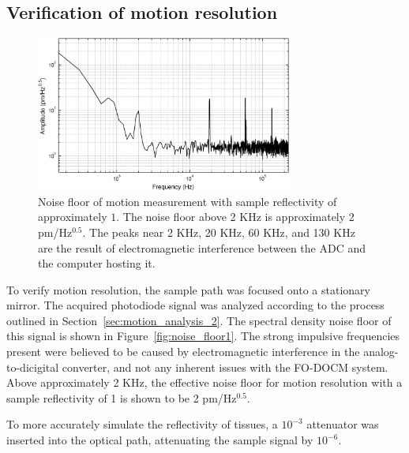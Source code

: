 \subsection{Verification of motion resolution}

\begin{figure}[h!]
\centering
\includegraphics[width=0.75\textwidth]{Images/Results/noise_floor_r1_sm.png}
\caption[Noise floor of motion measurement with sample reflectivity of approximately $1$.]{Noise floor of motion measurement with sample reflectivity of approximately $1$. The noise floor above 2 KHz is approximately 2 pm/Hz$^{0.5}$. The peaks near 2 KHz, 20 KHz, 60 KHz, and 130 KHz are the result of electromagnetic interference between the ADC and the computer hosting it. \label{ref:noise_floor1}}
\end{figure}

To verify motion resolution, the sample path was focused onto a stationary mirror. The acquired photodiode signal was analyzed according to the process outlined in Section~\ref{sec:motion_analysis_2}. The spectral density noise floor of this signal is shown in Figure~\ref{fig:noise_floor1}. The strong impulsive frequencies present were believed to be caused by electromagnetic interference in the analog-to-dicigital converter, and not any inherent issues with the FO-DOCM system. %
Above approximately 2 KHz, the effective noise floor for motion resolution with a sample reflectivity of 1 is shown to be 2 pm/Hz$^{0.5}$.

To more accurately simulate the reflectivity of tissues, a $10^{-3}$ attenuator was inserted into the optical path, attenuating the sample signal by $10^{-6}$. 

